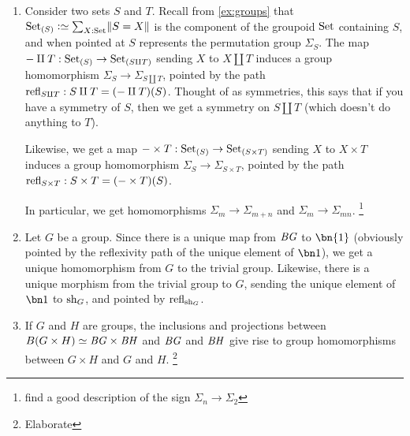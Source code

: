 \begin{example}%
  \label{ex:groups-morphisms}%
  \leavevmode
  \begin{enumerate}
  \item Consider two sets $S$ and $T$.  Recall from \cref{ex:groups}
    that $\conncomp \Set S \defequi\sum_{X:\Set}\Trunc{S=X}$ is the component
    of the groupoid $\mathrm{Set}$ containing $S$, and when pointed at $S$
    represents the permutation group $\Sigma_S$.  The map
    ${-}\amalg T:{{\mathrm{Set}}_{\left(S\right)}} \to {{\mathrm{Set}}_{\left(S\amalg T\right)}}$ sending $X$ to $X\coprod T$
    induces a group homomorphism $\Sigma_S\to\Sigma_{S\coprod T}$,
    pointed by the path $\refl {S\coprod T}:S\coprod T = (\blank\coprod T)(S)$.
    Thought of as symmetries, this says that if you have a symmetry of
    $S$, then we get a symmetry on $S\coprod T$ (which doesn't do
    anything to $T$).

    Likewise, we get a map
    ${-}\times T:\mathrm{Set}_{(S)}\to\mathrm{Set}_{(S\times T)}$ sending $X$ to
    $X\times T$ induces a group homomorphism
    $\Sigma_S\to\Sigma_{S\times T}$, pointed by the path
    $\refl {S\times T}: {S\times T} = (\blank \times T)(S)$.

In particular, we get homomorphisms $\Sigma_m\to\Sigma_{m+n}$ and $\Sigma_m\to\Sigma_{mn}$. \footnote{find a good description of the sign $\Sigma_n\to\Sigma_2$}
\item Let $G$ be a group.  Since there is a unique map from $\mathit{B}\mathit{G}$ to
  $\bn{1} $ (obviously pointed by the reflexivity path of the unique
  element of $\bn 1$), we get a unique homomorphism from $G$ to the
  trivial group.  Likewise, there is a unique morphism from the
  trivial group to $G$, sending the unique element of $\bn 1$ to
  $\mathrm{sh}_G$, and pointed by $\refl {\sh_G}$.
\item If $G$ and $H$ are groups, the inclusions and projections between $B(G\times H)\oldequiv\BG\times\BH$ and $\mathit{B}\mathit{G}$ and $\mathit{B}\mathit{H}$ give rise to group homomorphisms between $G\times H$ and $G$ and $H$.  \footnote{Elaborate}
  \end{enumerate}
\end{example}

